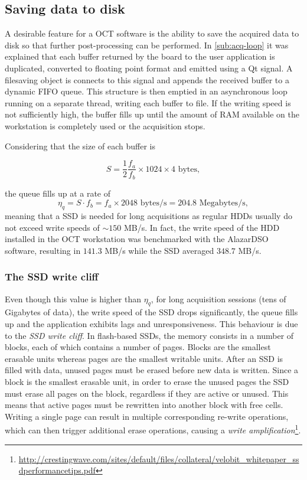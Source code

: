 \subsection{Saving data to disk}
A desirable feature for a OCT software is the ability to save the acquired data to disk so that further post-processing can be performed. In \autoref{sub:acq-loop} it was explained that each buffer returned by the board to the user application is duplicated, converted to floating point format and emitted using a Qt signal. A filesaving object is connects to this signal and appends the received buffer to a dynamic FIFO queue. This structure is then emptied in an asynchronous loop running on a separate thread, writing each buffer to file. If the writing speed is not sufficiently high, the buffer fills up until the amount of RAM available on the workstation is completely used or the acquisition stops. 

Considering that the size of each buffer is

\begin{equation}
	S = \frac{1}{2} \frac{f_a}{f_b} \times 1024 \times 4 \text{ bytes},
\end{equation}

the queue fills up at a rate of
\begin{equation}
\eta_{q} = S \cdot f_b = f_a \times 2048\text{ bytes/s} = 204.8\text{ Megabytes/s},
\end{equation}
meaning that a \ac{SSD} is needed for long acquisitions as regular \acp{HDD} usually do not exceed write speeds of $\sim 150$ MB/s. In fact, the write speed of the HDD installed in the OCT workstation was benchmarked with the AlazarDSO software, resulting in $141.3$ MB/s while the SSD averaged $348.7$ MB/s. 

\subsubsection{The SSD write cliff}
Even though this value is higher than $\eta_q$, for long acquisition sessions (tens of Gigabytes of data), the write speed of the SSD drops significantly, the queue fills up and the application exhibits lags and unresponsiveness. This behaviour is due to the \emph{SSD write cliff}. In flash-based SSDs, the memory consists in a number of blocks, each of which contains a number of pages. Blocks are the smallest erasable units whereas pages are the smallest writable units. After an SSD is filled with data, unused pages must be erased before new data is written. Since a block is the smallest erasable unit, in order to erase the unused pages the SSD must erase all pages on the block, regardless if they are active or unused. This means that active pages must be rewritten into another block with free cells. Writing a single page can result in multiple corresponding re-write operations, which can then trigger additional erase operations, causing a \emph{write amplification}\footnote{\url{http://crestingwave.com/sites/default/files/collateral/velobit_whitepaper_ssdperformancetips.pdf}}. 

